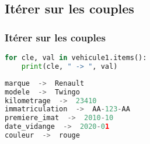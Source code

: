\documentclass[svgnames,11pt]{beamer}
\begin{document}
\subsection{Itérer sur les couples}
\begin{frame}[fragile]
    \frametitle{Itérer sur les couples}

\begin{lstlisting}[language=Python , basicstyle=\ttfamily\small, xleftmargin=2em, xrightmargin=2em]
for cle, val in vehicule1.items():
    print(cle, " -> ", val)
\end{lstlisting}

\begin{lstlisting}[language=Python , basicstyle=\ttfamily\small, xleftmargin=2em, xrightmargin=2em]
marque  ->  Renault
modele  ->  Twingo
kilometrage  ->  23410
immatriculation  ->  AA-123-AA
premiere_imat  ->  2010-10
date_vidange  ->  2020-01
couleur  ->  rouge
\end{lstlisting}
\end{frame}
\end{document}
